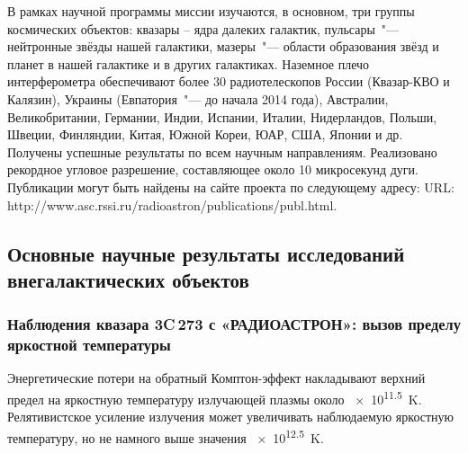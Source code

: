 В рамках научной программы миссии изучаются, в основном, три группы космических объектов: квазары –
ядра далеких галактик, пульсары~"--- нейтронные звёзды нашей галактики, мазеры~"--- области
образования звёзд и планет в нашей галактике и в других галактиках. Наземное плечо интерферометра
обеспечивают более 30 радиотелескопов России (Квазар-КВО и Калязин), Украины (Евпатория~"--- до
начала 2014 года), Австралии, Великобритании, Германии, Индии, Испании, Италии, Нидерландов, Польши,
Швеции, Финляндии, Китая, Южной Кореи, ЮАР, США, Японии и др. Получены успешные результаты по всем
научным направлениям. Реализовано рекордное угловое разрешение, составляющее около 10 микросекунд
дуги. Публикации могут быть найдены на сайте проекта по следующему адресу: URL:
http://www.asc.rssi.ru/radioastron/publications/publ.html.

\subsection{Основные научные результаты исследований внегалактических объектов}

\subsubsection{Наблюдения квазара 3C\,273 с «РАДИОАСТРОН»: вызов пределу яркостной температуры}

Энергетические потери на обратный Комптон-эффект накладывают верхний предел на яркостную
температуру излучающей плазмы около \SI{e11.5}{\kelvin}. Релятивистское усиление излучения может
увеличивать наблюдаемую яркостную температуру, но не намного выше значения \SI{e12.5}{\kelvin}.

